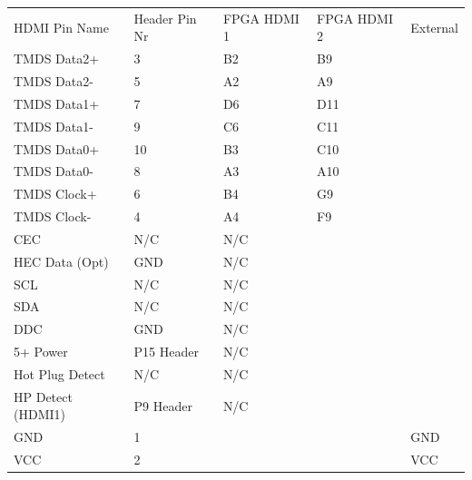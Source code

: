 \begin{table}[]
\begin{tabular}{lllll}
        HDMI Pin Name            & Header Pin Nr & FPGA HDMI 1 & FPGA HDMI 2 & External \\
        TMDS Data2+              & 3             & B2              & B9              &          \\
        TMDS Data2-              & 5             & A2              & A9              &          \\
        TMDS Data1+              & 7             & D6              & D11             &          \\
        TMDS Data1-              & 9             & C6              & C11             &          \\
        TMDS Data0+              & 10            & B3              & C10             &          \\
        TMDS Data0-              & 8             & A3              & A10             &          \\
        TMDS Clock+              & 6             & B4              & G9              &          \\
        TMDS Clock-              & 4             & A4              & F9              &          \\
        CEC                      & N/C           & N/C             &                 &          \\
        HEC Data (Opt)           & GND           & N/C             &                 &          \\
        SCL                      & N/C           & N/C             &                 &          \\
        SDA                      & N/C           & N/C             &                 &          \\
        DDC                      & GND           & N/C             &                 &          \\
        5+ Power                 & P15 Header    & N/C             &                 &          \\
        Hot Plug Detect          & N/C           & N/C             &                 &          \\
        HP Detect (HDMI1) & P9 Header     & N/C             &                 &          \\
        GND & 1             &                 &                 & GND      \\
        VCC & 2             &                 &                 & VCC      \\
    \end{tabular}
\end{table}

